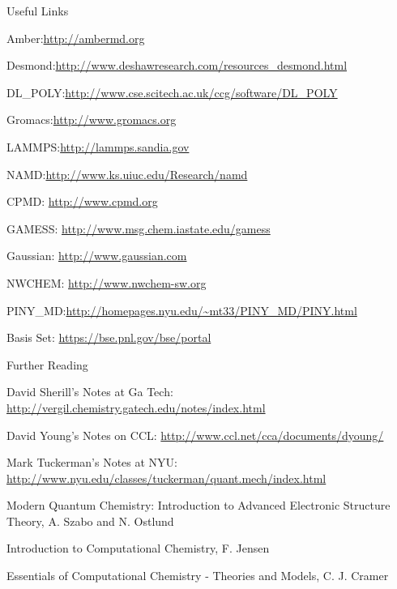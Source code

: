 \documentclass[slidestop,mathserif,compress,xcolor=svgnames]{beamer}
\begin{document}
\begin{frame}[allowframebreaks]
\begin{block}{Useful Links}
\begin{itemize}
{\footnotesize\color{Blue}
\item{\color{tigerspurple}Amber:}\url{http://ambermd.org}
\item{\color{tigerspurple}Desmond:}\url{http://www.deshawresearch.com/resources_desmond.html}
\item{\color{tigerspurple}DL\_POLY:}\url{http://www.cse.scitech.ac.uk/ccg/software/DL_POLY}
\item{\color{tigerspurple}Gromacs:}\url{http://www.gromacs.org}
\item{\color{tigerspurple}LAMMPS:}\url{http://lammps.sandia.gov}
\item{\color{tigerspurple}NAMD:}\url{http://www.ks.uiuc.edu/Research/namd}
\item {\color{tigerspurple}CPMD:} \url{http://www.cpmd.org}
\item {\color{tigerspurple}GAMESS:} \url{http://www.msg.chem.iastate.edu/gamess}
\item {\color{tigerspurple}Gaussian:} \url{http://www.gaussian.com}
\item {\color{tigerspurple}NWCHEM:} \url{http://www.nwchem-sw.org}
\item{\color{tigerspurple}PINY\_MD:}\url{http://homepages.nyu.edu/~mt33/PINY_MD/PINY.html}
\item {\color{tigerspurple}Basis Set:} \url{https://bse.pnl.gov/bse/portal}
}
\end{itemize}
\end{block}
\begin{block}{\small Further Reading}
\begin{itemize}
{\scriptsize
\item David Sherill's Notes at Ga Tech: {\color{Blue}\url{http://vergil.chemistry.gatech.edu/notes/index.html}}
\item David Young's Notes on CCL: {\color{Blue}\url{http://www.ccl.net/cca/documents/dyoung/}}
\item Mark Tuckerman's Notes at NYU: {\color{Blue}\url{http://www.nyu.edu/classes/tuckerman/quant.mech/index.html}}
\item Modern Quantum Chemistry: Introduction to Advanced Electronic Structure Theory, A. Szabo and N. Ostlund
\item Introduction to Computational Chemistry, F. Jensen
\item Essentials of Computational Chemistry - Theories and Models, C. J. Cramer
}
\end{itemize}
\end{block}
\end{frame}
\end{document}

